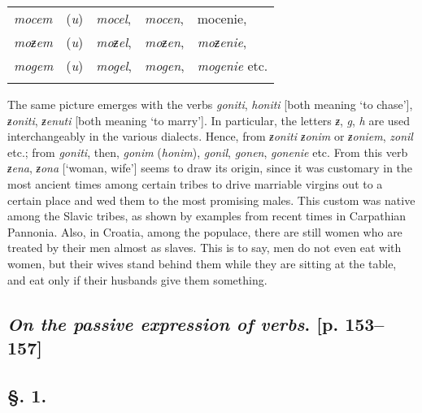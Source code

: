 \begin{longtable}{ l l l l l }
\lsptoprule
    \textit{mocem} & (\textit{u}) & \textit{mocel}, & \textit{mocen}, & mocenie, \\
    \textit{moƶem} & (\textit{u}) & \textit{moƶel}, & \textit{moƶen}, & \textit{moƶenie}, \\
    \textit{mogem} & (\textit{u}) & \textit{mogel}, & \textit{mogen}, & \textit{mogenie} etc. \\
    \lspbottomrule
\end{longtable}

The same picture emerges with the verbs \textit{goniti}, \textit{honiti} [both meaning ‘to chase’], \textit{ƶoniti}, \textit{ƶenuti} [both meaning ‘to marry’]. In particular, the letters \textit{ƶ}, \textit{g}, \textit{h} are used interchangeably in the various dialects. Hence, from \textit{ƶoniti ƶonim} or \textit{ƶoniem}, \textit{zonil} etc.; from \textit{goniti}, then, \textit{gonim} (\textit{honim}), \textit{gonil}, \textit{gonen}, \textit{gonenie} etc. From this verb \textit{ƶena}, \textit{ƶona} [‘woman, wife’] seems to draw its origin, since it was customary in the most ancient times among certain tribes to drive marriable virgins out to a certain place and wed them to the most promising males. This custom was native among the Slavic tribes, as shown by examples from recent times in Carpathian Pannonia. Also, in Croatia, among the populace, there are still women who are treated by their men almost as slaves. This is to say, men do not even eat with women, but their wives stand behind them while they are sitting at the table, and eat only if their husbands give them something.

\subsection*{\textit{On the passive expression of verbs}. [p. 153--157]}

\subsection*{\hspace*{\fill}§. 1.\hspace*{\fill}}

